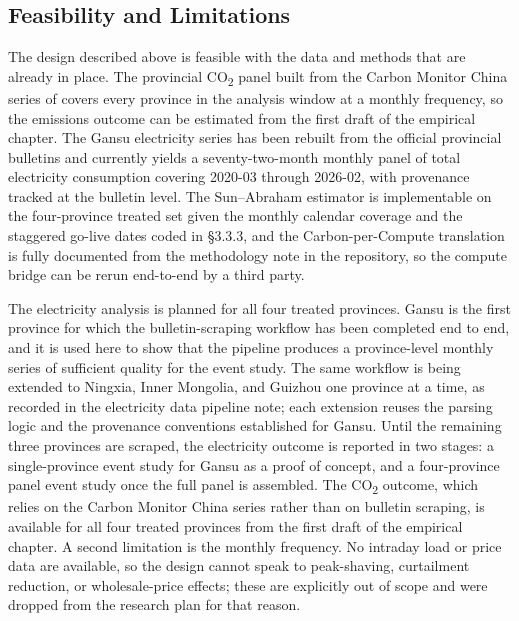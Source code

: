 \documentclass[12pt,a4paper]{article}
\begin{document}
\subsection{Feasibility and Limitations}
%
%
%
%

The design described above is feasible with the data and methods that
are already in place. The provincial CO\textsubscript{2} panel built
from the Carbon Monitor China series of
\citet{liuetal-2020-carbonmonitornearrealtimea} covers every province
in the analysis window at a monthly frequency, so the emissions
outcome can be estimated from the first draft of the empirical
chapter. The Gansu electricity series has been rebuilt from the
official provincial bulletins and currently yields a seventy-two-month
monthly panel of total electricity consumption covering 2020-03
through 2026-02, with provenance tracked at the bulletin level. The
Sun--Abraham estimator is implementable on the four-province treated
set given the monthly calendar coverage and the staggered go-live
dates coded in §3.3.3, and the Carbon-per-Compute translation is
fully documented from the methodology note in the repository, so the
compute bridge can be rerun end-to-end by a third party.

The electricity analysis is planned for all four treated provinces.
Gansu is the first province for which the bulletin-scraping workflow
has been completed end to end, and it is used here to show that the
pipeline produces a province-level monthly series of sufficient
quality for the event study. The same workflow is being extended to
Ningxia, Inner Mongolia, and Guizhou one province at a time, as
recorded in the electricity data pipeline note; each extension reuses
the parsing logic and the provenance conventions established for
Gansu. Until the remaining three provinces are scraped, the
electricity outcome is reported in two stages: a single-province
event study for Gansu as a proof of concept, and a four-province
panel event study once the full panel is assembled. The
CO\textsubscript{2} outcome, which relies on the Carbon Monitor China
series rather than on bulletin scraping, is available for all four
treated provinces from the first draft of the empirical chapter. A second limitation is the
monthly frequency. No intraday load or price data are available, so
the design cannot speak to peak-shaving, curtailment reduction, or
wholesale-price effects; these are explicitly out of scope and were
dropped from the research plan for that reason.
\end{document}
